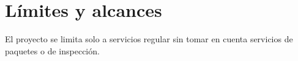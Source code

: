 \section{L\'imites y alcances}
El proyecto se limita solo a servicios regular sin tomar en cuenta servicios de paquetes o de
inspecci\'on.

